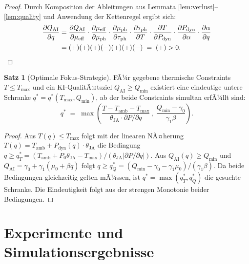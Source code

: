 ﻿\documentclass[a4paper,12pt]{article}
\theoremstyle{definition}
\newtheorem{satz}{Satz}
\begin{document}
\begin{proof}
Durch Komposition der Ableitungen aus Lemmata \ref{lem:verlust}--\ref{lem:quality} und
Anwendung der Kettenregel ergibt sich:
\begin{align*}
\frac{\partial Q_{\mathrm{AI}}}{\partial q}
&= \frac{\partial Q_{\mathrm{AI}}}{\partial \mu_{\mathrm{eff}}}
   \cdot \frac{\partial \mu_{\mathrm{eff}}}{\partial \mu_{\mathrm{ph}}}
   \cdot \frac{\partial \mu_{\mathrm{ph}}}{\partial \tau_{\mathrm{ph}}}
   \cdot \frac{\partial \tau_{\mathrm{ph}}}{\partial T}
   \cdot \frac{\partial T}{\partial P_{\mathrm{dyn}}}
   \cdot \frac{\partial P_{\mathrm{dyn}}}{\partial \alpha}
   \cdot \frac{\partial \alpha}{\partial q} \\
&= (+)(+)(+)(-)(+)(+)(-) \;=\; (+) > 0. \qedhere
\end{align*}
\end{proof}

\begin{satz}[Optimale Fokus-Strategie]
\label{satz:optimal}
FÃ¼r gegebene thermische Constraints $T \leq T_{\max}$ und ein KI-QualitÃ¤tsziel
$Q_{\mathrm{AI}} \geq Q_{\min}$ existiert eine eindeutige untere Schranke
$q^* = q^*(T_{\max}, Q_{\min})$, ab der beide Constraints simultan erfÃ¼llt sind:
\[
q^* \;=\; \max\!\left(
\frac{T - T_{\mathrm{amb}} - T_{\max}}{\theta_{\mathrm{JA}} \cdot \partial P/\partial q}\,, \;
\frac{Q_{\min} - \gamma_0}{\gamma_1 \beta}
\right).
\]
\end{satz}

\begin{proof}
Aus $T(q) \leq T_{\max}$ folgt mit der linearen NÃ¤herung
$T(q) = T_{\mathrm{amb}} + P_{\mathrm{dyn}}(q) \cdot \theta_{\mathrm{JA}}$ die Bedingung
$q \geq q_T^* = (T_{\mathrm{amb}} + P_0 \theta_{\mathrm{JA}} - T_{\max}) / (\theta_{\mathrm{JA}} |\partial P/\partial q|)$.
Aus $Q_{\mathrm{AI}}(q) \geq Q_{\min}$ und $Q_{\mathrm{AI}} = \gamma_0 + \gamma_1(\mu_0 + \beta q)$
folgt $q \geq q_Q^* = (Q_{\min} - \gamma_0 - \gamma_1 \mu_0)/(\gamma_1 \beta)$.
Da beide Bedingungen gleichzeitig gelten mÃ¼ssen, ist $q^* = \max(q_T^*, q_Q^*)$ die
gesuchte Schranke. Die Eindeutigkeit folgt aus der strengen Monotonie beider Bedingungen. \qedhere
\end{proof}

\section{Experimente und Simulationsergebnisse}
\end{document}
